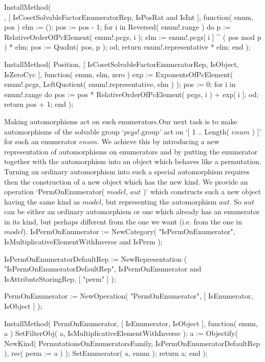 \begintt
InstallMethod( \[\], [ IsCosetSolvableFactorEnumeratorRep,
        IsPosRat and IsInt ],
    function( enum, pos )
    elm := ();
    pos := pos - 1;
    for i  in Reversed( enum!.range )  do
        p := RelativeOrderOfPcElement( enum!.pcgs, i );
        elm := enum!.pcgs[ i ] ^ ( pos mod p ) * elm;
        pos := QuoInt( pos, p );
    od;
    return enum!.representative * elm;
end );
\endtt

\begintt
InstallMethod( Position, [ IsCosetSolvableFactorEnumeratorRep,
        IsObject, IsZeroCyc ],
    function( enum, elm, zero )
    exp := ExponentsOfPcElement( enum!.pcgs,
                   LeftQuotient( enum!.representative, elm ) );
    pos := 0;
    for i  in enum!.range  do
        pos := pos * RelativeOrderOfPcElement( pcgs, i ) + exp[ i ];
    od;
    return pos + 1;
end );
\endtt

{\bsf  Making automorphisms act  on such enumerators.}\quad Our next task
is to make automorphisms of the  solvable group `$pcgs$!.group' act on `[
1 .. Length( $enum$ )  ]' for such an  enumerator $enum$. We achieve this
by  introducing a new  representation of automorphisms on enumerators and
by putting the enumerator together  with the automorphism into an  object
which behaves like  a permutation. Turning  an ordinary automorphism into
such  a special  automorphism requires  then   the construction of  a new
object which has the new kind. We provide an operation `PermOnEnumerator(
$model$, $aut$ )' which constructs such a new object having the same kind
as  $model$,  but representing the  automorphism  $aut$. So $aut$  can be
either an ordinary automorphism or one which already has an enumerator in
its kind, but perhaps  different from the one  we want (i.e. from the one
in $model$).
\begintt
IsPermOnEnumerator := NewCategory( "IsPermOnEnumerator",
    IsMultiplicativeElementWithInverse and IsPerm );
\endtt

\begintt
IsPermOnEnumeratorDefaultRep := NewRepresentation
    ( "IsPermOnEnumeratorDefaultRep",
      IsPermOnEnumerator and IsAttributeStoringRep,
      [ "perm" ] );

PermOnEnumerator := NewOperation( "PermOnEnumerator",
    [ IsEnumerator, IsObject ] );
\endtt

\begintt
InstallMethod( PermOnEnumerator,
        [ IsEnumerator, IsObject ],
    function( enum, a )
    SetFilterObj( a, IsMultiplicativeElementWithInverse );
    a := Objectify( NewKind( PermutationsOnEnumeratorsFamily,
                 IsPermOnEnumeratorDefaultRep ),
                 rec( perm := a ) );
    SetEnumerator( a, enum );
    return a;
end );
\endtt

